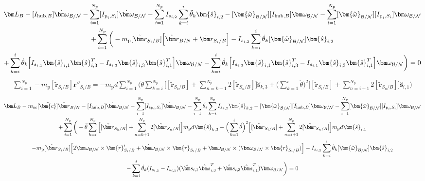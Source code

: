 \documentclass[paper]{aiaaNew}
\begin{document}
\begin{multline}
	\bm L_B -[I_{\text{hub},B}] \dot{\bm\omega}_{\cal B/N} - \sum\limits_{i=1}^{N_p}[I_{\text{p}_i,S_i}] \dot{\bm\omega}_{\cal B/N} - \sum\limits_{i=1}^{N_p} I_{s_{i,2}}\sum^{i}_{k=i} \ddot{\theta}_k \bm{\hat{s}}_{i,2} -[\bm{\tilde{\omega}}_{\cal B/N}] [I_{\text{hub},B}] \bm\omega_{\cal B/N} - \sum\limits_{i=1}^{N_p}[\bm{\tilde{\omega}}_{\cal B/N}] [I_{\text{p}_i,S_i}] \bm\omega_{\cal B/N} \\
	+ \sum\limits_{i=1}^{N_p}\bigg(- m_{\text{p}} [\tilde{{\bm r}}_{S_{i}/B}] \Big[\ddot{\bm r}_{B/N} + \ddot{\bm r}_{S_{i}/B}\Big]
	- I_{s_{i,2}} \sum^{i}_{k=i} \dot{\theta}_k [\bm{\tilde{\omega}}_{\cal B/N}] \bm{\hat{s}}_{i,2} \\
	+ \sum^{i}_{k=i} \dot{\theta}_k \Big[I_{s_{i,1}}\bm{\hat{s}}_{i,1} \bm{\hat{s}}_{i,3}^T -  I_{s_{i,3}} \bm{\hat{s}}_{i,3} \bm{\hat{s}}_{i,1}^T\Big] \bm\omega_{\cal B/N} -  \sum^{i}_{k=i} \dot{\theta}_k \Big[I_{s_{i,3}}\bm{\hat{s}}_{i,1} \bm{\hat{s}}_{i,3}^T -  I_{s_{i,1}} \bm{\hat{s}}_{i,3} \bm{\hat{s}}_{i,1}^T\Big] \bm\omega_{\cal B/N} \bigg) = 0
\end{multline}
\begin{multline}
    \sum\limits_{i=1}^{N_p} - m_{\text{p}} [\tilde{{\bm r}}_{S_{i}/B}] \bm r''_{S_{i}/B} = -m_{\text{p}} d \sum\limits_{i=1}^{N_p} \Bigg(\ddot{\theta}\sum\limits_{k=i}^{N_p}\Big[ [\tilde{{\bm r}}_{S_{k}/B}] + \sum\limits_{n=k+1}^{N_p}2[\tilde{{\bm r}}_{S_{n}/B}]\Big]\bm{\hat{s}}_{k,3} + \Big( \sum\limits_{k=1}^{i} \dot{\theta}\Big)^2 \Big[[\tilde{{\bm r}}_{S_{i}/B}] + \sum\limits_{n=i+1}^{N_p}2[\tilde{{\bm r}}_{S_{n}/B}]\Big]\bm{\hat{s}}_{i,1} \Bigg)
\end{multline}
\begin{multline}
\bm L_B - m_{\text{sc}}[\tilde{\bm{c}}]\ddot{\bm r}_{B/N} -[I_{\text{hub},B}] \dot{\bm\omega}_{\cal B/N} - \sum\limits_{i=1}^{N_p}[I_{\text{sp}_i,S_i}] \dot{\bm\omega}_{\cal B/N} - \sum\limits_{i=1}^{N_p} \ddot{\theta}_i \sum^{N_p}_{k=i}I_{s_{k,2}} \bm{\hat{s}}_{k,2} -[\bm{\tilde{\omega}}_{\cal B/N}] [I_{\text{hub},B}] \bm\omega_{\cal B/N} - \sum\limits_{i=1}^{N_p}[\bm{\tilde{\omega}}_{\cal B/N}] [I_{\text{p}_i,S_i}] \bm\omega_{\cal B/N} \\
+ \sum\limits_{i=1}^{N_p}\bigg( - \ddot{\theta}\sum\limits_{k=i}^{N_p}\Big[ [\tilde{{\bm r}}_{S_{k}/B}] + \sum\limits_{n=k+1}^{N_p}2[\tilde{{\bm r}}_{S_{n}/B}]\Big]m_{\text{p}} d \bm{\hat{s}}_{k,3} - \Big( \sum\limits_{k=1}^{i} \dot{\theta}\Big)^2 \Big[[\tilde{{\bm r}}_{S_{i}/B}] + \sum\limits_{n=i+1}^{N_p}2[\tilde{{\bm r}}_{S_{n}/B}]\Big] m_{\text{p}} d \bm{\hat{s}}_{i,1}\\ 
- m_{\text{p}} [\tilde{{\bm r}}_{S_{i}/B}] \Big[ 
2 \bm\omega_{\cal B/N} \times \bm{r}'_{S_i/B} +  \dot{\bm\omega}_{\cal B/N} \times \bm{r}_{S_i/B}
+ \bm\omega_{\cal B/N} \times (\bm\omega_{\cal B/N} \times \bm{r}_{S_i/B})\Big]
- I_{s_{i,2}} \sum^{i}_{k=i} \dot{\theta}_k [\bm{\tilde{\omega}}_{\cal B/N}] \bm{\hat{s}}_{i,2} \\
-\sum^{i}_{k=i} \dot{\theta}_k (I_{s_{i,3}}-I_{s_{i,1}})(\hat{\bm s}_{i,1}\hat{\bm s}_{i,3}^{T}+\hat{\bm s}_{i,3}\hat{\bm s}_{i,1}^{T}) \bm\omega_{\cal B/N} \bigg) = 0
\end{multline}
\end{document}
